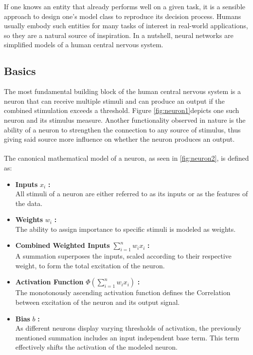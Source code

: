 If one knows an entity that already performs well on a given task, it is a sensible approach to design one's model class to reproduce its decision process. Humans usually embody such entities for many tasks of interest in real-world applications, so they are a natural source of inspiration. In a nutshell, neural networks are simplified models of a human central nervous system.\\

\subsection{Basics}
The most fundamental building block of the human central nervous system is a neuron that can receive multiple stimuli and can produce an output if the combined stimulation exceeds a threshold. Figure \ref{fig:neuron1}depicts one such neuron and its stimulus measure. Another functionality observed in nature is the ability of a neuron to strengthen the connection to any source of stimulus, thus giving said source more influence on whether the neuron produces an output.\cite{Biology_Background}\\
\\
The canonical mathematical model of a neuron, as seen in \ref{fig:neuron2}, is defined as:
\begin{itemize}
	\item \textbf{Inputs} $x_i$ \textbf{:}\\
	All stimuli of a neuron are either referred to as its inputs or as the features of the data.\\
	\item \textbf{Weights} $w_i$ \textbf{:}\\
	The ability to assign importance to specific stimuli is modeled as weights.\\
	\item \textbf{Combined Weighted Inputs} $\sum_{i=1}^{n}w_i x_i$ \textbf{:}\\
	A summation superposes the inputs, scaled according to their respective weight, to form the total excitation of the neuron.\\
	\item \textbf{Activation Function} $\Phi(\sum_{i=1}^{n}w_i x_i)$ \textbf{:}\\
	The monotonously ascending activation function defines the Correlation between excitation of the neuron and its output signal.\\
	\item \textbf{Bias} $b$ \textbf{:}\\  
	As different neurons display varying thresholds of activation, the previously mentioned summation includes an input independent base term. This term effectively shifts the activation of the modeled neuron.\\
\end{itemize}

